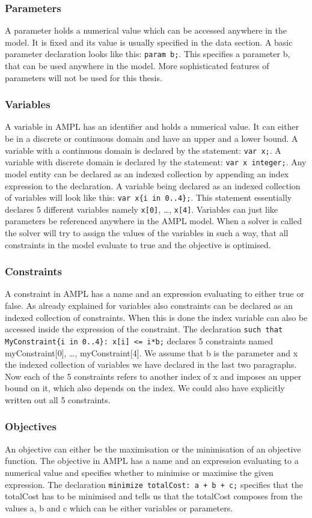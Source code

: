 \subsubsection{Parameters}
A parameter holds a numerical value which can be accessed anywhere in the model. It is fixed and its value is usually specified in the data section. A basic parameter declaration looks like this: \verb=param b;=. This specifies a parameter b, that can be used anywhere in the model. More sophisticated features of parameters will not be used for this thesis.
\subsubsection{Variables}
A variable in AMPL has an identifier and holds a numerical value. It can either be in a discrete or continuous domain and have an upper and a lower bound. A variable with a continuous domain is declared by the statement: \verb=var x;=. A variable with discrete domain is declared by the statement: \verb=var x integer;=. Any model entity can be declared as an indexed collection by appending an index expression to the declaration. A variable being declared as an indexed collection of variables will look like this: \verb=var x{i in 0..4};=. This statement essentially declares 5 different variables namely \verb=x[0]=, \ldots , \verb=x[4]=. Variables can just like parameters be referenced anywhere in the AMPL model. When a solver is called the solver will try to assign the values of the variables in such a way, that all constraints in the model evaluate to true and the objective is optimised.
\subsubsection{Constraints}
A constraint in AMPL has a name and an expression evaluating to either true or false. As already explained for variables also constraints can be declared as an indexed collection of constraints. When this is done the index variable can also be accessed inside the expression of the constraint. The declaration \verb&such that MyConstraint{i in 0..4}: x[i] <= i*b;& declares 5 constraints named myConstraint[0], \ldots, myConstraint[4]. We assume that b is the parameter and x the indexed collection of variables we have declared in the last two paragraphs. Now each of the 5 constraints refers to another index of x and imposes an upper bound on it, which also depends on the index. We could also have explicitly written out all 5 constraints.
\subsubsection{Objectives}
An objective can either be the maximisation or the minimisation of an objective function. The objective in AMPL has a name and an expression evaluating to a numerical value and specifies whether to minimise or maximise the given expression. The declaration \verb&minimize totalCost: a + b + c;& specifies that the totalCost has to be minimised and tells us that the totalCost composes from the values a, b and c which can be either variables or parameters. 
